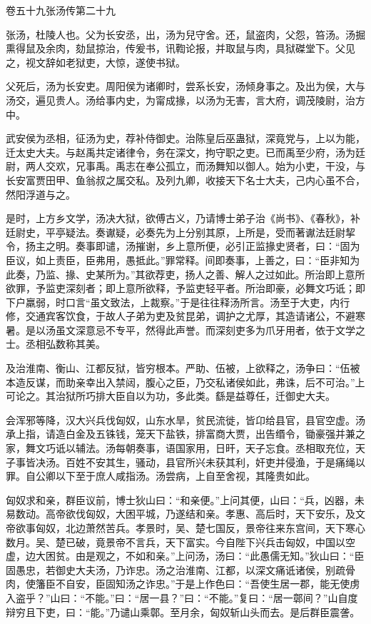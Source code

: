 \documentclass[12pt,UTF8]{ctexbook}
\begin{document}
卷五十九张汤传第二十九



张汤，杜陵人也。父为长安丞，出，汤为兒守舍。还，鼠盗肉，父怨，笞汤。汤掘熏得鼠及余肉，劾鼠掠治，传爰书，讯鞫论报，并取鼠与肉，具狱磔堂下。父见之，视文辞如老狱吏，大惊，遂使书狱。



父死后，汤为长安吏。周阳侯为诸卿时，尝系长安，汤倾身事之。及出为侯，大与汤交，遍见贵人。汤给事内史，为甯成掾，以汤为无害，言大府，调茂陵尉，治方中。



武安侯为丞相，征汤为史，荐补侍御史。治陈皇后巫蛊狱，深竟党与，上以为能，迁太史大夫。与赵禹共定诸律令，务在深文，拘守职之吏。已而禹至少府，汤为廷尉，两人交欢，兄事禹。禹志在奉公孤立，而汤舞知以御人。始为小吏，干没，与长安富贾田甲、鱼翁叔之属交私。及列九卿，收接天下名士大夫，己内心虽不合，然阳浮道与之。



是时，上方乡文学，汤决大狱，欲傅古义，乃请博士弟子治《尚书》、《春秋》，补廷尉史，平亭疑法。奏谳疑，必奏先为上分别其原，上所是，受而著谳法廷尉挈令，扬主之明。奏事即谴，汤摧谢，乡上意所便，必引正监掾史贤者，曰：“固为臣议，如上责臣，臣弗用，愚抵此。”罪常释。间即奏事，上善之，曰：“臣非知为此奏，乃监、掾、史某所为。”其欲荐吏，扬人之善、解人之过如此。所治即上意所欲罪，予监吏深刻者；即上意所欲释，予监吏轻平者。所治即豪，必舞文巧诋；即下户羸弱，时口言“虽文致法，上裁察。”于是往往释汤所言。汤至于大吏，内行修，交通宾客饮食，于故人子弟为吏及贫昆弟，调护之尤厚，其造请诸公，不避寒暑。是以汤虽文深意忌不专平，然得此声誉。而深刻吏多为爪牙用者，依于文学之士。丞相弘数称其美。



及治淮南、衡山、江都反狱，皆穷根本。严助、伍被，上欲释之，汤争曰：“伍被本造反谋，而助亲幸出入禁闼，腹心之臣，乃交私诸侯如此，弗诛，后不可治。”上可论之。其治狱所巧排大臣自以为功，多此类。繇是益尊任，迁御史大夫。



会浑邪等降，汉大兴兵伐匈奴，山东水旱，贫民流徙，皆卬给县官，县官空虚。汤承上指，请造白金及五铢钱，笼天下盐铁，排富商大贾，出告缗令，锄豪强并兼之家，舞文巧诋以辅法。汤每朝奏事，语国家用，日旰，天子忘食。丞相取充位，天子事皆决汤。百姓不安其生，骚动，县官所兴未获其利，奸吏并侵渔，于是痛绳以罪。自公卿以下至于庶人咸指汤。汤尝病，上自至舍视，其隆贵如此。



匈奴求和亲，群臣议前，博士狄山曰：“和亲便。”上问其便，山曰：“兵，凶器，未易数动。高帝欲伐匈奴，大困平城，乃遂结和亲。孝惠、高后时，天下安乐，及文帝欲事匈奴，北边萧然苦兵。孝景时，吴、楚七国反，景帝往来东宫间，天下寒心数月。吴、楚已破，竟景帝不言兵，天下富实。今自陛下兴兵击匈奴，中国以空虚，边大困贫。由是观之，不如和亲。”上问汤，汤曰：“此愚儒无知。”狄山曰：“臣固愚忠，若御史大夫汤，乃诈忠。汤之治淮南、江都，以深文痛诋诸侯，别疏骨肉，使籓臣不自安，臣固知汤之诈忠。”于是上作色曰：“吾使生居一郡，能无使虏入盗乎？”山曰：“不能。”曰：“居一县？”曰：“不能。”复曰：“居一鄣间？”山自度辩穷且下吏，曰：“能。”乃谴山乘鄣。至月余，匈奴斩山头而去。是后群臣震詟。
\end{document}
